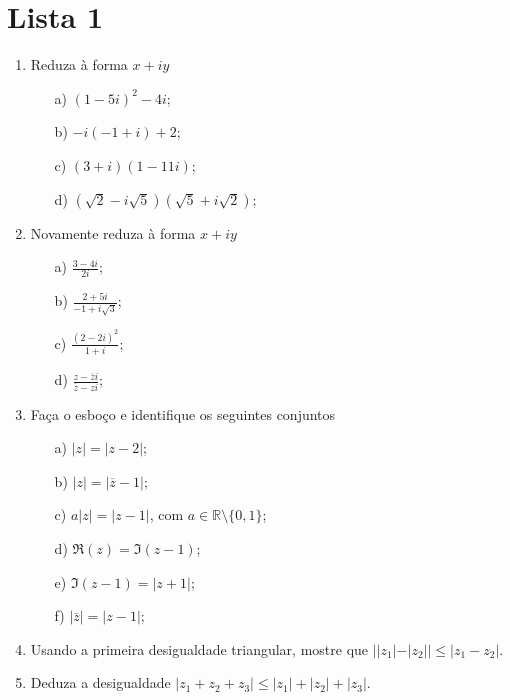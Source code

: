 \chapter*{Lista 1}




\begin{enumerate}[leftmargin=*]

	\item Reduza à forma $x+iy$
	\begin{itemize}
		\item[a)] $(1-5i)^2-4i$;
		\item[b)] $-i(-1+i)+2$;
		\item[c)] $(3+i)(1-11i)$;
		\item[d)] $(\sqrt{2}-i\sqrt{5})(\sqrt{5}+i\sqrt{2})$;
	\end{itemize}
	\item Novamente reduza à forma $x+iy$ 
	\begin{itemize}
		\item[a)] $\displaystyle\frac{3-4i}{2i}$;\\
		\item[b)] $\displaystyle\frac{2+5i}{-1+i\sqrt{3}}$;\\
		\item[c)] $\displaystyle\frac{(2-2i)^2}{1+i}$;\\
		\item[d)] $\displaystyle\frac{z-\overline{z}i}{\overline{z}-zi}$;\\[-0.3cm]
	\end{itemize}
	\item Faça o esboço e identifique os seguintes conjuntos 
	\begin{itemize}
		\item[a)] $|z|=|z-2|$;
		\item[b)] $|z|=|\overline{z}-1|$;
		\item[c)] $a|z|=|z-1|$, com $a\in\mathbb{R}\setminus\{0,1\}$;
		\item[d)] $\Re(z)=\Im(z-1)$;
		\item[e)] $\Im(z-1)=|z+1|$;
		\item[f)] $|\overline{z}|=|z-1|$;
	\end{itemize}
	\item Usando a primeira desigualdade triangular, mostre que $||z_1|-|z_2||\leq |z_1-z_2|$.
	\item Deduza a desigualdade $|z_1+z_2+z_3|\leq |z_1|+|z_2|+|z_3|$.

\end{enumerate}
